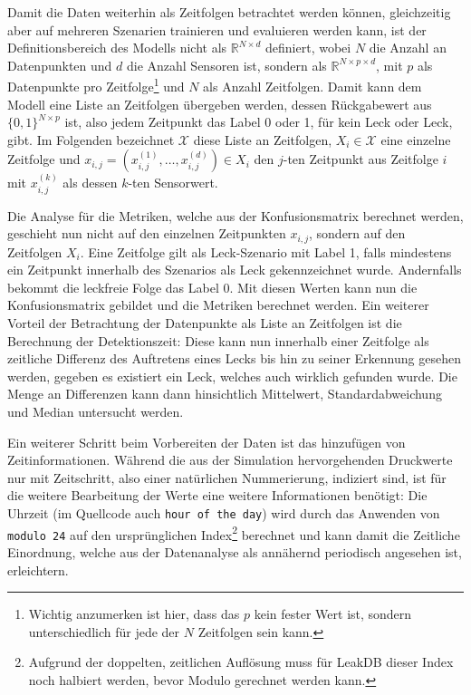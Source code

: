 Damit die Daten weiterhin als Zeitfolgen betrachtet werden können, gleichzeitig aber auf mehreren Szenarien
 trainieren und evaluieren werden kann, ist der Definitionsbereich des Modells nicht als $\mathbb{R}^{N \times d}$
 definiert, wobei $N$ die Anzahl an Datenpunkten und $d$ die Anzahl Sensoren ist, sondern als
 $\mathbb{R}^{N \times p \times d}$, mit $p$ als Datenpunkte pro Zeitfolge\footnote{Wichtig anzumerken ist hier,
 dass das $p$ kein fester Wert ist, sondern unterschiedlich für jede der $N$ Zeitfolgen sein kann.} und $N$
 als Anzahl Zeitfolgen. Damit kann dem Modell eine Liste an Zeitfolgen übergeben werden,
 dessen Rückgabewert aus $\{0, 1\}^{N \times p}$ ist, also jedem Zeitpunkt das Label 0 oder 1, für kein Leck
 oder Leck, gibt. Im Folgenden bezeichnet $\mathcal{X}$ diese Liste an Zeitfolgen,
 $X_i \in \mathcal{X}$ eine einzelne Zeitfolge und $x_{i, j} = (x_{i, j}^{(1)}, \dots, x_{i, j}^{(d)}) \in X_i$ den $j$-ten
 Zeitpunkt aus Zeitfolge $i$ mit $x_{i, j}^{(k)}$ als dessen $k$-ten Sensorwert.

Die Analyse für die Metriken, welche aus der
 Konfusionsmatrix berechnet werden, geschieht nun nicht auf den einzelnen Zeitpunkten $x_{i, j}$, sondern auf
 den Zeitfolgen $X_i$. Eine Zeitfolge gilt als Leck-Szenario mit Label 1, falls mindestens ein Zeitpunkt
 innerhalb des Szenarios als Leck gekennzeichnet wurde. Andernfalls bekommt die leckfreie Folge das Label 0.
 Mit diesen Werten kann nun die Konfusionsmatrix gebildet und die Metriken berechnet werden. Ein weiterer Vorteil
 der Betrachtung der Datenpunkte als Liste an Zeitfolgen ist die Berechnung der Detektionszeit: Diese kann nun
 innerhalb einer Zeitfolge als zeitliche Differenz des Auftretens eines Lecks bis hin zu seiner Erkennung gesehen
 werden, gegeben es existiert ein Leck, welches auch wirklich gefunden wurde. Die Menge an Differenzen kann dann
 hinsichtlich Mittelwert, Standardabweichung und Median untersucht werden.

Ein weiterer Schritt beim Vorbereiten der Daten ist das hinzufügen von Zeitinformationen. Während die aus der
 Simulation hervorgehenden Druckwerte nur mit Zeitschritt, also einer natürlichen Nummerierung, indiziert sind,
 ist für die weitere Bearbeitung der Werte eine weitere Informationen benötigt: Die Uhrzeit (im Quellcode auch
 \texttt{hour of the day}) wird durch das Anwenden von \texttt{modulo 24} auf den ursprünglichen
 Index\footnote{Aufgrund der doppelten, zeitlichen Auflösung muss für LeakDB dieser Index noch halbiert werden,
 bevor Modulo gerechnet werden kann.} berechnet und kann damit die Zeitliche Einordnung, welche aus der
 Datenanalyse als annähernd periodisch angesehen ist, erleichtern.


